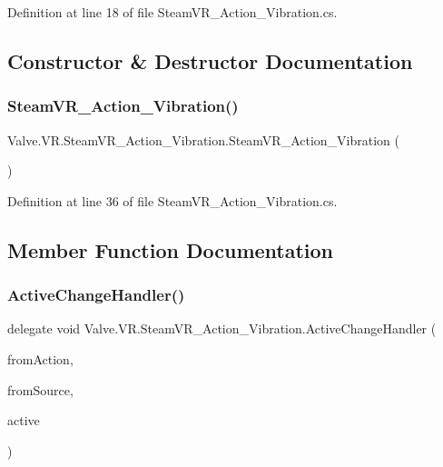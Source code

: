 Definition at line 18 of file Steam\+V\+R\+\_\+\+Action\+\_\+\+Vibration.\+cs.



\subsection{Constructor \& Destructor Documentation}
\mbox{\label{class_valve_1_1_v_r_1_1_steam_v_r___action___vibration_a8fafb6f9a381a3e3084686eb1cd9d1f2}} 
\subsubsection{\texorpdfstring{SteamVR\_Action\_Vibration()}{SteamVR\_Action\_Vibration()}}
{\footnotesize\ttfamily Valve.\+V\+R.\+Steam\+V\+R\+\_\+\+Action\+\_\+\+Vibration.\+Steam\+V\+R\+\_\+\+Action\+\_\+\+Vibration (\begin{DoxyParamCaption}{ }\end{DoxyParamCaption})}



Definition at line 36 of file Steam\+V\+R\+\_\+\+Action\+\_\+\+Vibration.\+cs.



\subsection{Member Function Documentation}
\mbox{\label{class_valve_1_1_v_r_1_1_steam_v_r___action___vibration_a7706b3c9b71de3bea16a3fab8a882f0b}} 
\subsubsection{\texorpdfstring{ActiveChangeHandler()}{ActiveChangeHandler()}}
{\footnotesize\ttfamily delegate void Valve.\+V\+R.\+Steam\+V\+R\+\_\+\+Action\+\_\+\+Vibration.\+Active\+Change\+Handler (\begin{DoxyParamCaption}\item[{\mbox{\hyperlink{class_valve_1_1_v_r_1_1_steam_v_r___action___vibration}{Steam\+V\+R\+\_\+\+Action\+\_\+\+Vibration}}}]{from\+Action,  }\item[{\mbox{\hyperlink{namespace_valve_1_1_v_r_a82e5bf501cc3aa155444ee3f0662853f}{Steam\+V\+R\+\_\+\+Input\+\_\+\+Sources}}}]{from\+Source,  }\item[{bool}]{active }\end{DoxyParamCaption})}

